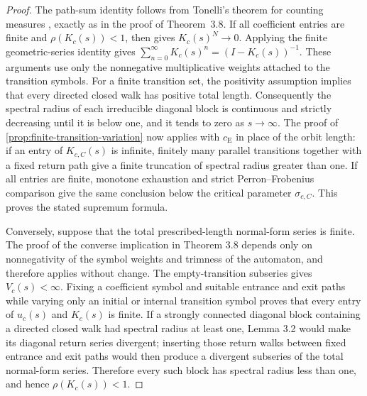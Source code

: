 \documentclass[11pt]{article}
\theoremstyle{definition}
\begin{document}
\begin{proof}
The path-sum identity follows from Tonelli's theorem for counting
measures
\cite[Theorem~2.37, p.~67]{FollandRealAnalysis},
exactly as in the proof of Theorem~3.8.  If all coefficient
entries are finite and \(\rho(K_c(s))<1\), then
\cite[Theorem~5.6.12]{HornJohnson2013}
gives \(K_c(s)^N\to0\).  Applying the finite geometric-series
identity gives
$
  \sum_{n=0}^{\infty}K_c(s)^n
  =
  (I-K_c(s))^{-1}.
$
These arguments use only the nonnegative multiplicative weights
attached to the transition symbols.  For a finite transition set, the positivity assumption implies
that every directed closed walk has positive total length.  Consequently the spectral radius
of each irreducible diagonal block is continuous and strictly decreasing until it is below one,
and it tends to zero as $s\to\infty$.  The proof of
\cref{prop:finite-transition-variation} now applies with $c_{\mathrm E}$ in place of the orbit
length: if an entry of $K_{c,C}(s)$ is infinite, finitely many parallel transitions together
with a fixed return path give a finite truncation of spectral radius greater than one. If all
entries are finite, monotone exhaustion and strict Perron--Frobenius comparison give the same
conclusion below the critical parameter $\sigma_{c,C}$.  This proves the stated supremum
formula.

Conversely, suppose that the total prescribed-length normal-form series is finite. The proof of the converse implication in Theorem 3.8 depends only on nonnegativity of the symbol weights and trimness of the automaton, and therefore applies without change. The empty-transition subseries gives \(V_c(s)<\infty\). Fixing a coefficient symbol and suitable entrance and exit paths while varying only an initial or internal transition symbol proves that every entry of \(u_c(s)\) and \(K_c(s)\) is finite. If a strongly connected diagonal block containing a directed closed walk had spectral radius at least one, Lemma 3.2 would make its diagonal return series divergent; inserting those return walks between fixed entrance and exit paths would then produce a divergent subseries of the total normal-form series. Therefore every such block has spectral radius less than one, and hence \(\rho(K_c(s))<1\).
\end{proof}
\end{document}
